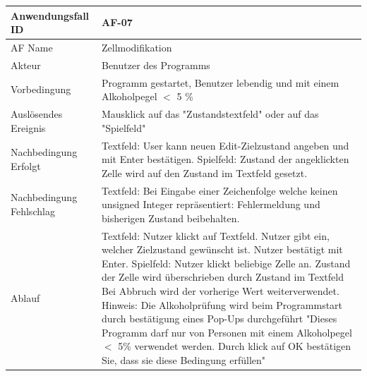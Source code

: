 \documentclass[11pt,a4paper]{article}
\begin{document}
\begin{tabular}[m]{|m{7cm}|m{9cm}|}
    \hline
    Anwendungsfall ID     & AF-07 \\
         \hline
    AF Name     & Zellmodifikation \\
         \hline
    Akteur&Benutzer des Programms \\
    \hline
    Vorbedingung&Programm gestartet, Benutzer lebendig und mit einem Alkoholpegel $<$ 5 \% \\
    \hline
    Auslösendes Ereignis&Mausklick auf das "Zustandstextfeld" oder auf das "Spielfeld"\\
    \hline
    Nachbedingung Erfolgt& Textfeld: User kann neuen Edit-Zielzustand angeben und mit Enter bestätigen. Spielfeld: Zustand der angeklickten Zelle wird auf den Zustand im Textfeld gesetzt. \\
    \hline
    Nachbedingung Fehlschlag&Textfeld: Bei Eingabe einer Zeichenfolge welche keinen unsigned Integer repräsentiert: Fehlermeldung und bisherigen Zustand beibehalten.\\
    \hline
    Ablauf&Textfeld: Nutzer klickt auf Textfeld. Nutzer gibt ein, welcher Zielzustand gewünscht ist. Nutzer bestätigt mit Enter. 
    \linebreak
    Spielfeld: Nutzer klickt beliebige Zelle an. Zustand der Zelle wird überschrieben durch Zustand im Textfeld
    Bei Abbruch wird der vorherige Wert weiterverwendet.
    \linebreak 
    Hinweis: Die Alkoholprüfung wird beim Programmstart durch bestätigung eines Pop-Ups durchgeführt "Dieses Programm darf nur von Personen mit einem Alkoholpegel $<$ 5\% verwendet werden. Durch klick auf OK bestätigen Sie, dass sie diese Bedingung erfüllen"\\
    \hline
    
\end{tabular}
\par
\end{document}
